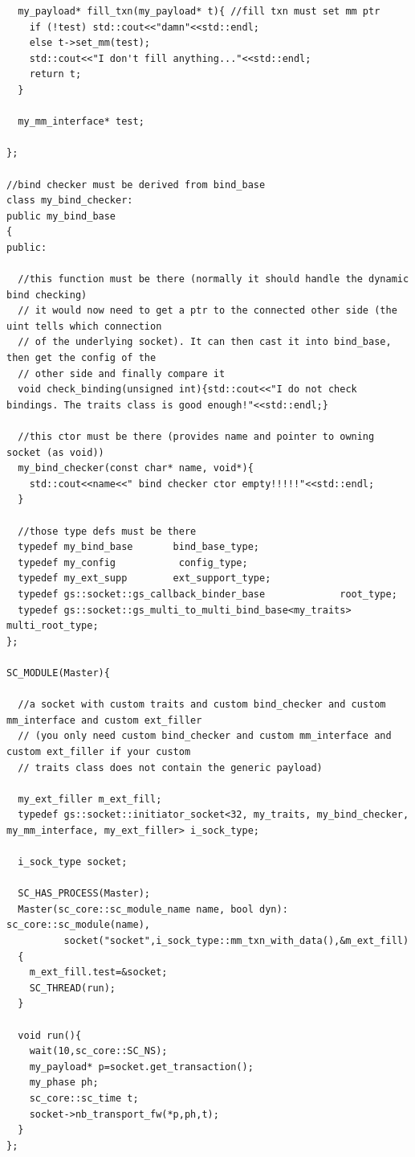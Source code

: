 \documentclass[a4paper,10pt]{article}          %
\begin{document}
\begin{lstlisting}
  my_payload* fill_txn(my_payload* t){ //fill txn must set mm ptr
    if (!test) std::cout<<"damn"<<std::endl;
    else t->set_mm(test);
    std::cout<<"I don't fill anything..."<<std::endl;
    return t;
  }
  
  my_mm_interface* test;
  
};

//bind checker must be derived from bind_base
class my_bind_checker:
public my_bind_base
{
public:

  //this function must be there (normally it should handle the dynamic bind checking)
  // it would now need to get a ptr to the connected other side (the uint tells which connection
  // of the underlying socket). It can then cast it into bind_base, then get the config of the
  // other side and finally compare it
  void check_binding(unsigned int){std::cout<<"I do not check bindings. The traits class is good enough!"<<std::endl;} 
  
  //this ctor must be there (provides name and pointer to owning socket (as void))
  my_bind_checker(const char* name, void*){
    std::cout<<name<<" bind checker ctor empty!!!!!"<<std::endl;
  }
  
  //those type defs must be there
  typedef my_bind_base       bind_base_type;
  typedef my_config           config_type;
  typedef my_ext_supp        ext_support_type;
  typedef gs::socket::gs_callback_binder_base             root_type;
  typedef gs::socket::gs_multi_to_multi_bind_base<my_traits> multi_root_type;
};

SC_MODULE(Master){

  //a socket with custom traits and custom bind_checker and custom mm_interface and custom ext_filler
  // (you only need custom bind_checker and custom mm_interface and custom ext_filler if your custom
  // traits class does not contain the generic payload)
  
  my_ext_filler m_ext_fill;
  typedef gs::socket::initiator_socket<32, my_traits, my_bind_checker, my_mm_interface, my_ext_filler> i_sock_type;

  i_sock_type socket;
  
  SC_HAS_PROCESS(Master);
  Master(sc_core::sc_module_name name, bool dyn): sc_core::sc_module(name), 
          socket("socket",i_sock_type::mm_txn_with_data(),&m_ext_fill)
  {
    m_ext_fill.test=&socket;
    SC_THREAD(run);
  }

  void run(){
    wait(10,sc_core::SC_NS);
    my_payload* p=socket.get_transaction();
    my_phase ph;
    sc_core::sc_time t;
    socket->nb_transport_fw(*p,ph,t);
  }
};


\end{lstlisting}
\end{document}
